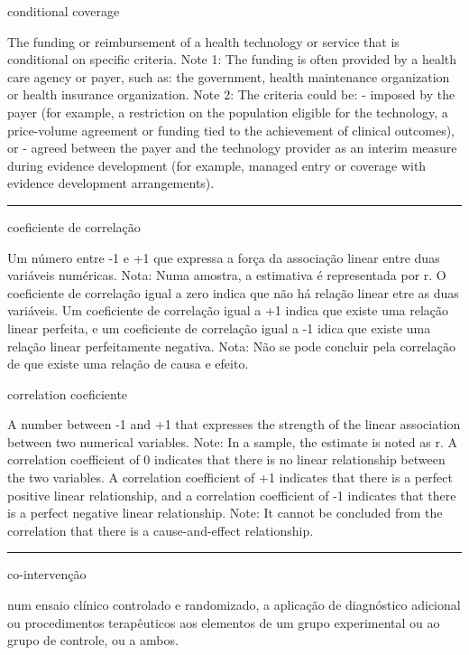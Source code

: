\documentclass[
  openany]{book}
\begin{document}
conditional coverage

The funding or reimbursement of a health technology or service that is conditional on specific criteria. Note 1: The funding is often provided by a health care agency or payer, such as: the government, health maintenance organization or health insurance organization. Note 2: The criteria could be:
- imposed by the payer (for example, a restriction on the population eligible for the technology, a price-volume agreement or funding tied to the achievement of clinical outcomes), or
- agreed between the payer and the technology provider as an interim measure during evidence development (for example, managed entry or coverage with evidence development arrangements).

\begin{center}\rule{0.5\linewidth}{0.5pt}\end{center}

coeficiente de correlação

Um número entre -1 e +1 que expressa a força da associação linear entre duas variáveis numéricas. Nota: Numa amostra, a estimativa é representada por r. O coeficiente de correlação igual a zero indica que não há relação linear etre as duas variáveis. Um coeficiente de correlação igual a +1 indica que existe uma relação linear perfeita, e um coeficiente de correlação igual a -1 idica que existe uma relação linear perfeitamente negativa. Nota: Não se pode concluir pela correlação de que existe uma relação de causa e efeito.

correlation coeficiente

A number between -1 and +1 that expresses the strength of the linear association between two numerical variables. Note: In a sample, the estimate is noted as r. A correlation coefficient of 0 indicates that there is no linear relationship between the two variables. A correlation coefficient of +1 indicates that there is a perfect positive linear relationship, and a correlation coefficient of -1 indicates that there is a perfect negative linear relationship. Note: It cannot be concluded from the correlation that there is a cause-and-effect relationship.

\begin{center}\rule{0.5\linewidth}{0.5pt}\end{center}

co-intervenção

num ensaio clínico controlado e randomizado, a aplicação de diagnóstico adicional ou procedimentos terapêuticos aos elementos de um grupo experimental ou ao grupo de controle, ou a ambos.
\end{document}
